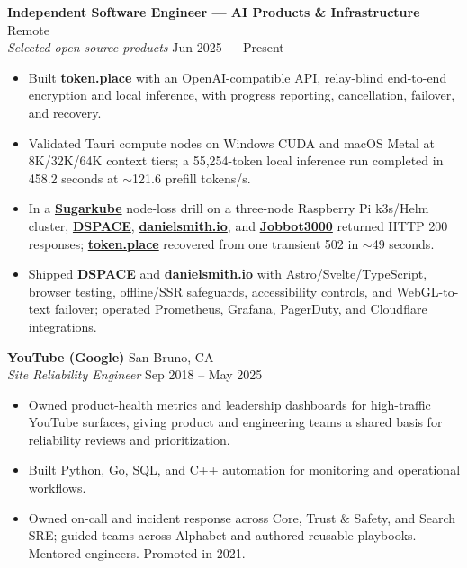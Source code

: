 \documentclass[11pt]{article}
\begin{document}
\textbf{Independent Software Engineer --- AI Products \& Infrastructure} \hfill Remote\\
\textit{Selected open-source products} \hfill Jun 2025 --- Present
\begin{itemize}
  \item Built \href{https://token.place}{\textbf{token.place}} with an OpenAI-compatible API,
  relay-blind end-to-end encryption and local inference, with progress reporting, cancellation,
  failover, and recovery.
  \item Validated Tauri compute nodes on Windows CUDA and macOS Metal at 8K/32K/64K context
  tiers; a 55,254-token local inference run completed in 458.2 seconds at ${\sim}$121.6 prefill
  tokens/s.
  \item In a \href{https://github.com/futuroptimist/sugarkube}{\textbf{Sugarkube}} node-loss drill
  on a three-node Raspberry Pi k3s/Helm cluster,
  \href{https://democratized.space}{\textbf{DSPACE}},
  \href{https://danielsmith.io}{\textbf{danielsmith.io}}, and
  \href{https://github.com/futuroptimist/jobbot3000}{\textbf{Jobbot3000}}
  returned HTTP 200 responses;
  \href{https://token.place}{\textbf{token.place}} recovered from one transient 502 in ${\sim}$49
  seconds.
  \item Shipped \href{https://democratized.space}{\textbf{DSPACE}} and
  \href{https://danielsmith.io}{\textbf{danielsmith.io}} with Astro/Svelte/TypeScript, browser
  testing, offline/SSR safeguards, accessibility controls, and WebGL-to-text failover; operated
  Prometheus, Grafana, PagerDuty, and Cloudflare integrations.
\end{itemize}

\textbf{YouTube (Google)} \hfill San Bruno, CA\\
\textit{Site Reliability Engineer} \hfill Sep 2018 -- May 2025
\begin{itemize}
  \item Owned product-health metrics and leadership dashboards for high-traffic YouTube surfaces,
  giving product and engineering teams a shared basis for reliability reviews and prioritization.
  \item Built Python, Go, SQL, and C++ automation for monitoring and operational workflows.
  \item Owned on-call and incident response across Core, Trust \& Safety, and Search SRE; guided
  teams across Alphabet and authored reusable playbooks. Mentored engineers. Promoted in 2021.
\end{itemize}
\end{document}
